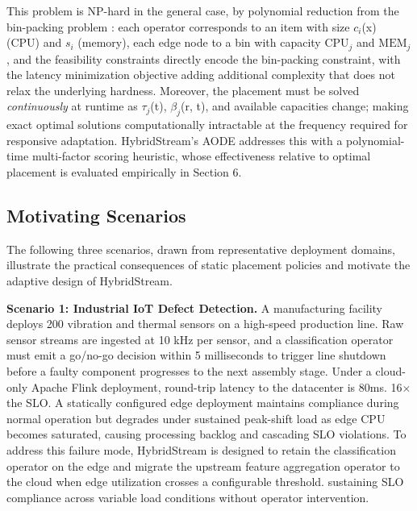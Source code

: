 \documentclass[preprint,review,12pt]{elsarticle}
\begin{document}
This problem is NP-hard in the general case, by polynomial reduction from the bin-packing problem \cite{garey1979np}: each operator corresponds to an item with size $c_i$(x) (CPU) and $s_i$ (memory), each edge node to a bin with capacity $\text{CPU}_j$ and $\text{MEM}_j$, and the feasibility constraints directly encode the bin-packing constraint, with the latency minimization objective adding additional complexity that does not relax the underlying hardness. Moreover, the placement must be solved \emph{continuously} at runtime as $\tau_j$(t), $\beta_j$(r, t), and available capacities change; making exact optimal solutions computationally intractable at the frequency required for responsive adaptation. HybridStream's AODE addresses this with a polynomial-time multi-factor scoring heuristic, whose effectiveness relative to optimal placement is evaluated empirically in Section 6.

\subsection{Motivating Scenarios}\label{motivating-scenarios}

The following three scenarios, drawn from representative deployment domains, illustrate the practical consequences of static placement policies and motivate the adaptive design of HybridStream.

\textbf{Scenario 1: Industrial IoT Defect Detection.} A manufacturing facility deploys 200 vibration and thermal sensors on a high-speed production line. Raw sensor streams are ingested at 10 kHz per sensor, and a classification operator must emit a go/no-go decision within 5 milliseconds to trigger line shutdown before a faulty component progresses to the next assembly stage. Under a cloud-only Apache Flink deployment, round-trip latency to the datacenter is 80ms. 16$\times$ the SLO. A statically configured edge deployment maintains compliance during normal operation but degrades under sustained peak-shift load as edge CPU becomes saturated, causing processing backlog and cascading SLO violations. To address this failure mode, HybridStream is designed to retain the classification operator on the edge and migrate the upstream feature aggregation operator to the cloud when edge utilization crosses a configurable threshold. sustaining SLO compliance across variable load conditions without operator intervention.
\end{document}
